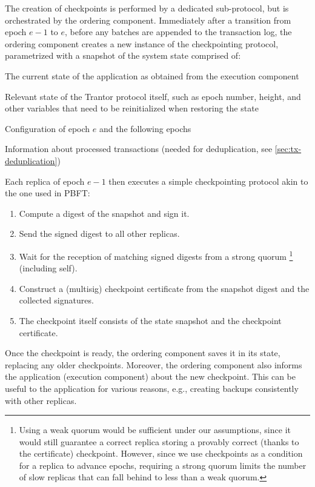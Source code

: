 \documentclass{article}
\begin{document}
The creation of checkpoints is performed by a dedicated sub-protocol, but is orchestrated by the ordering component.
Immediately after a transition from epoch $e-1$ to $e$, before any batches are appended to the transaction log,
the ordering component creates a new instance of the checkpointing protocol,
parametrized with a snapshot of the system state comprised of:
\begin{compactitem}
\item The current state of the application as obtained from the execution component
\item Relevant state of the Trantor protocol itself,
such as epoch number, height, and other variables that need to be reinitialized when restoring the state
\item Configuration of epoch $e$ and the  following epochs
\item Information about processed transactions (needed for deduplication, see \cref{sec:tx-deduplication})
\end{compactitem}
Each replica of epoch $e-1$ then executes a simple checkpointing protocol akin to the one used in PBFT:
\begin{enumerate}

\item Compute a digest of the snapshot and sign it.

\item Send the signed digest to all other replicas.

\item Wait for the reception of matching signed digests from a strong quorum%
\footnote{Using a weak quorum would be sufficient under our assumptions,
since it would still guarantee a correct replica storing a provably correct (thanks to the certificate) checkpoint.
However, since we use checkpoints as a condition for a replica to advance epochs,
requiring a strong quorum limits the number of slow replicas that can fall behind to less than a weak quorum.}
(including self).

\item Construct a (multisig) checkpoint certificate from the snapshot digest and the collected signatures.

\item The checkpoint itself consists of the state snapshot and the checkpoint certificate.

\end{enumerate}

Once the checkpoint is ready, the ordering component saves it in its state, replacing any older checkpoints.
Moreover, the ordering component also informs the application (execution component) about the new checkpoint.
This can be useful to the application for various reasons, e.g., creating backups consistently with other replicas.
\end{document}
